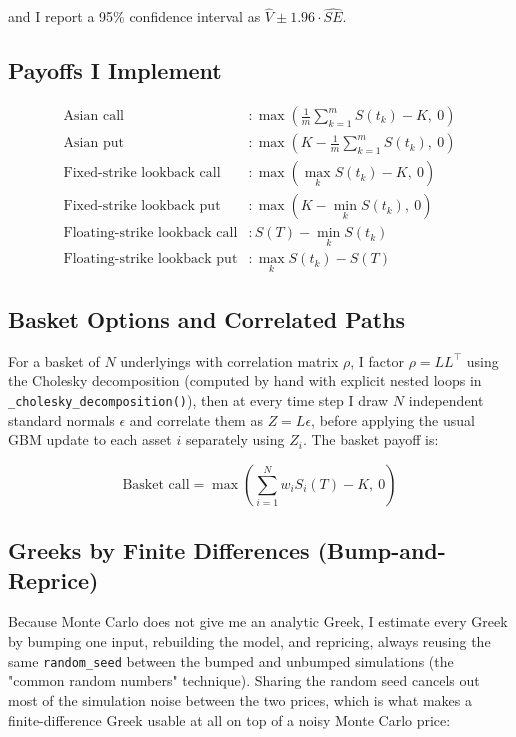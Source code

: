 \documentclass[12pt,a4paper]{article}
\begin{document}
and I report a 95\% confidence interval as $\hat{V} \pm 1.96 \cdot \widehat{SE}$.

\subsection{Payoffs I Implement}

\begin{align}
\text{Asian call} &: \max\left(\frac{1}{m}\sum_{k=1}^m S(t_k) - K,\ 0\right) \\
\text{Asian put} &: \max\left(K - \frac{1}{m}\sum_{k=1}^m S(t_k),\ 0\right) \\
\text{Fixed-strike lookback call} &: \max\left(\max_k S(t_k) - K,\ 0\right) \\
\text{Fixed-strike lookback put} &: \max\left(K - \min_k S(t_k),\ 0\right) \\
\text{Floating-strike lookback call} &: S(T) - \min_k S(t_k) \\
\text{Floating-strike lookback put} &: \max_k S(t_k) - S(T)
\end{align}

\subsection{Basket Options and Correlated Paths}

For a basket of $N$ underlyings with correlation matrix $\rho$, I factor
$\rho = LL^\top$ using the Cholesky decomposition (computed by hand with
explicit nested loops in \texttt{\_cholesky\_decomposition()}), then at
every time step I draw $N$ independent standard normals $\epsilon$ and
correlate them as $Z = L\epsilon$, before applying the usual GBM update
to each asset $i$ separately using $Z_i$. The basket payoff is:

\begin{equation}
\text{Basket call} = \max\left(\sum_{i=1}^N w_i S_i(T) - K,\ 0\right)
\end{equation}

\subsection{Greeks by Finite Differences (Bump-and-Reprice)}

Because Monte Carlo does not give me an analytic Greek, I estimate every
Greek by bumping one input, rebuilding the model, and repricing, always
reusing the same \texttt{random\_seed} between the bumped and unbumped
simulations (the "common random numbers" technique). Sharing the random
seed cancels out most of the simulation noise between the two prices,
which is what makes a finite-difference Greek usable at all on top of a
noisy Monte Carlo price:
\end{document}

